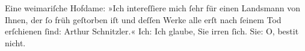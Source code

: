 \pstart
           Eine weimariſche Hofdame: »Ich intereſſiere mich{ }ſehr für
               einen Landsmann von Ihnen, der{ }ſo früh geſtorben iſt und deſſen Werke alle erſt nach{ }ſeinem Tod erſchienen{ }ſind: Arthur Schnitzler.« Ich: Ich glaube, Sie irren{ }ſich. Sie:
               O, besti{\geminationm}t nicht.\pend
           \endnumbering{}  \newcommand{\dateiname}{L01317}\newcommand{\titel}{Hugo von Hofmannsthal an Arthur Schnitzler, 28. 8. 1903}\newcommand{\editorInnen}{Martin Anton Müller und Gerd-Hermann Susen}
